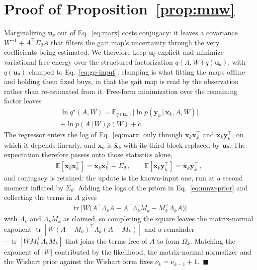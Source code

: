\documentclass[lettersize,journal]{IEEEtran}
\DeclareMathOperator{\tr}{tr}
\newcommand{\E}{\mathbb{E}}
\newcommand{\given}[1][]{\,#1\vert\,}
\begin{document}
\section{Proof of Proposition~\ref{prop:mnw}}
\label{appx:belief-updating}
Marginalizing $\mathbf{u}_{\theta}$ out of Eq.~\ref{eq:marx} costs conjugacy: it leaves a covariance $W^{-1} + A^\top \Sigma_{\theta} A$ that filters the gait map's uncertainty through the very coefficients being estimated. We therefore keep $\mathbf{u}_{\theta}$ explicit and minimize variational free energy over the structured factorization $q(A,W)q(\mathbf{u}_{\theta})$, with $q(\mathbf{u}_{\theta})$ clamped to Eq.~\ref{eq:gp-input}; clamping is what fitting the maps offline and holding them fixed buys, in that the gait map is read by the observation rather than re-estimated from it. Free-form minimization over the remaining factor leaves
\begin{align*}
    \ln q^{\star}(A,W) = \E_{q(\mathbf{u}_{\theta})} \big[ \ln p(\mathbf{y}_k \given \mathbf{x}_k, A, W) \big] \\ + \ln p(A \given W) p(W) + c \, .
\end{align*}
The regressor enters the log of Eq.~\ref{eq:marx} only through $\mathbf{x}_k \mathbf{x}_k^\top$ and $\mathbf{x}_k \mathbf{y}_k^\top$, on which it depends linearly, and $\mathbf{x}_k$ is $\bar{\mathbf{x}}_k$ with its third block replaced by $\mathbf{u}_{\theta}$. The expectation therefore passes onto those statistics alone,
\begin{align*}
    \E [\mathbf{x}_k \mathbf{x}_k^\top] = \bar{\mathbf{x}}_k \bar{\mathbf{x}}_k^\top + \Sigma_{\theta} \, , \qquad \E [ \mathbf{x}_k \mathbf{y}_k^\top ] = \bar{\mathbf{x}}_k \mathbf{y}_k^\top \, ,
\end{align*}
and conjugacy is retained: the update is the known-input one, run at a second moment inflated by $\Sigma_{\theta}$. Adding the logs of the priors in Eq.~\ref{eq:mnw-prior} and collecting the terms in $A$ gives
\begin{align*}
    \tr \big[ W \big( A^\top \Lambda_k A - A^\top \Lambda_k M_k - M_k^\top \Lambda_k A \big) \big]
\end{align*}
with $\Lambda_k$ and $\Lambda_k M_k$ as claimed, so completing the square leaves the matrix-normal exponent $\tr [ W (A \! - \! M_k)^\top \Lambda_k (A \! - \! M_k) ]$ and a remainder $-\tr[W M_k^\top \Lambda_k M_k]$ that joins the terms free of $A$ to form $\Omega_k$. Matching the exponent of $|W|$ contributed by the likelihood, the matrix-normal normalizer and the Wishart prior against the Wishart form fixes $\nu_k = \nu_{k-1}+1$.~$\blacksquare$
\end{document}
